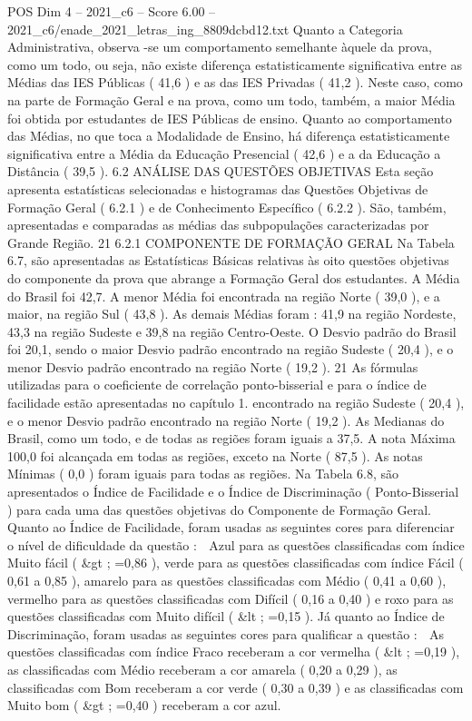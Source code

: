 \begin{textsample}{POS Dim 4 – 2021\_c6 – Score 6.00 – 2021\_c6/enade\_2021\_letras\_ing\_8809dcbd12.txt}
Quanto a Categoria Administrativa, observa -se um comportamento semelhante àquele da prova, como um todo, ou seja, não existe diferença estatisticamente significativa entre as Médias das IES Públicas ( 41,6 ) e as das IES Privadas ( 41,2 ).
Neste caso, como na parte de Formação Geral e na prova, como um todo, também, a maior Média foi obtida por estudantes de IES Públicas de ensino.
Quanto ao comportamento das Médias, no que toca a Modalidade de Ensino, há diferença estatisticamente significativa entre a Média da Educação Presencial ( 42,6 ) e a da Educação a Distância ( 39,5 ). 6.2 ANÁLISE DAS QUESTÕES OBJETIVAS Esta seção apresenta estatísticas selecionadas e histogramas das Questões Objetivas de Formação Geral ( 6.2.1 ) e de Conhecimento Específico ( 6.2.2 ).
São, também, apresentadas e comparadas as médias das subpopulações caracterizadas por Grande Região. 21 6.2.1 COMPONENTE DE FORMAÇÃO GERAL Na Tabela 6.7, são apresentadas as Estatísticas Básicas relativas às oito questões objetivas do componente da prova que abrange a Formação Geral dos estudantes.
A Média do Brasil foi 42,7.
A menor Média foi encontrada na região Norte ( 39,0 ), e a maior, na região Sul ( 43,8 ).
As demais Médias foram : 41,9 na região Nordeste, 43,3 na região Sudeste e 39,8 na região Centro-Oeste.
O Desvio padrão do Brasil foi 20,1, sendo o maior Desvio padrão encontrado na região Sudeste ( 20,4 ), e o menor Desvio padrão encontrado na região Norte ( 19,2 ). 21 As fórmulas utilizadas para o coeficiente de correlação ponto-bisserial e para o índice de facilidade estão apresentadas no capítulo 1. encontrado na região Sudeste ( 20,4 ), e o menor Desvio padrão encontrado na região Norte ( 19,2 ).
As Medianas do Brasil, como um todo, e de todas as regiões foram iguais a 37,5.
A nota Máxima 100,0 foi alcançada em todas as regiões, exceto na Norte ( 87,5 ).
As notas Mínimas ( 0,0 ) foram iguais para todas as regiões.
Na Tabela 6.8, são apresentados o Índice de Facilidade e o Índice de Discriminação ( Ponto-Bisserial ) para cada uma das questões objetivas do Componente de Formação Geral.
Quanto ao Índice de Facilidade, foram usadas as seguintes cores para diferenciar o nível de dificuldade da questão :  Azul para as questões classificadas com índice Muito fácil ( \&gt ; =0,86 ), verde para as questões classificadas com índice Fácil ( 0,61 a 0,85 ), amarelo para as questões classificadas com Médio ( 0,41 a 0,60 ), vermelho para as questões classificadas com Difícil ( 0,16 a 0,40 ) e roxo para as questões classificadas com Muito difícil ( \&lt ; =0,15 ).
Já quanto ao Índice de Discriminação, foram usadas as seguintes cores para qualificar a questão :  As questões classificadas com índice Fraco receberam a cor vermelha ( \&lt ; =0,19 ), as classificadas com Médio receberam a cor amarela ( 0,20 a 0,29 ), as classificadas com Bom receberam a cor verde ( 0,30 a 0,39 ) e as classificadas com Muito bom ( \&gt ; =0,40 ) receberam a cor azul.

\end{textsample}
